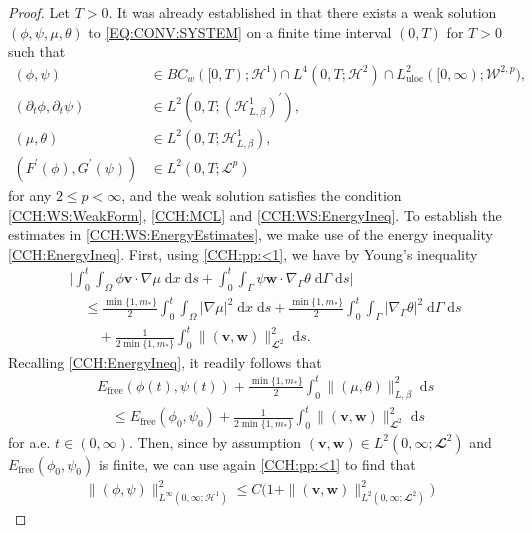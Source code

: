 \documentclass[10pt,reqno]{amsart}
\theoremstyle{remark}
\numberwithin{equation}{section}
\newcommand{\abs}[1]{| #1 |}
\newcommand{\Bigabs}[1]{\Big| #1 \Big|}
\newcommand{\norm}[1]{\| #1 \|}
\newcommand{\bv}{\mathbf{v}}
\newcommand{\bw}{\mathbf{w}}
\newcommand{\intO}{\int_\Omega}
\newcommand{\intG}{\int_\Gamma}
\newcommand{\ds}{\;\mathrm ds}
\newcommand{\dxs}{\;\mathrm{d}x\;\mathrm{d}s}
\newcommand{\dGs}{\;\mathrm{d}\Ga\;\mathrm{d}s}
\newcommand{\delt}{\partial_{t}}
\newcommand{\Grad}{\nabla}
\newcommand{\Gradg}{\nabla_\Ga}
\newcommand{\Ga}{\Gamma}
\begin{document}
\begin{proof}
    Let $T > 0$. It was already established in \cite[Theorem~3.2 and Theorem~3.3]{Giorgini2025} that there exists a weak solution $(\phi,\psi,\mu,\theta)$ to \eqref{EQ:CONV:SYSTEM} on a finite time interval $(0,T)$ for $T > 0$ such that
    \begin{align*}
        (\phi,\psi)&\in BC_w([0,T);\mathcal{H}^1)\cap L^4(0,T;\mathcal{H}^2)\cap L^2_{\mathrm{uloc}}([0,\infty);\mathcal{W}^{2,p}), \\
        (\delt\phi,\delt\psi)&\in L^2(0,T;(\mathcal{H}^1_{L,\beta})^\prime), \\
        (\mu,\theta)&\in L^2(0,T;\mathcal{H}^1_{L,\beta}), \\
        (F^\prime(\phi),G^\prime(\psi))&\in L^2(0,T;\mathcal{L}^p)
    \end{align*}
    for any $2 \leq p < \infty$, and the weak solution satisfies the condition \ref{CCH:WS:WeakForm}, \ref{CCH:MCL} and \ref{CCH:WS:EnergyIneq}. To establish the estimates in \ref{CCH:WS:EnergyEstimates}, we make use of the energy inequality \eqref{CCH:EnergyIneq}. First, using \eqref{CCH:pp:<1}, we have by Young's inequality
    \begin{align*}
        &\Bigabs{\int_0^t\intO \phi\bv\cdot\Grad\mu\dxs + \int_0^t\intG \psi\bw\cdot\Gradg\theta\dGs} \\
        &\quad\leq \frac{\min\{1,m_\ast\}}{2}\int_0^t\intO\abs{\Grad\mu}^2\dxs + \frac{\min\{1,m_\ast\}}{2}\int_0^t\intG\abs{\Gradg\theta}^2\dGs \\
        &\qquad + \frac{1}{2\min\{1,m_\ast\}}\int_0^t\norm{(\bv,\bw)}_{\mathbfcal{L}^2}^2\ds.
    \end{align*}
    Recalling \eqref{CCH:EnergyIneq}, it readily follows that
    \begin{align*}
        &E_{\mathrm{free}}(\phi(t),\psi(t)) + \frac{\min\{1,m_\ast\}}{2}\int_0^t\norm{(\mu,\theta)}_{L,\beta}^2\ds \\
        &\quad\leq E_{\mathrm{free}}(\phi_0,\psi_0) + \frac{1}{2\min\{1,m_\ast\}}\int_0^t \norm{(\bv,\bw)}_{\mathbfcal{L}^2}^2\ds
    \end{align*}
    for a.e. $t\in(0,\infty)$. Then, since by assumption $(\bv,\bw)\in L^2(0,\infty;\mathbfcal{L}^2)$ and $E_{\mathrm{free}}(\phi_0,\psi_0)$ is finite, we can use again \eqref{CCH:pp:<1} to find that
    \begin{align}\label{Est:PP:H1:Linfty}
        \norm{(\phi,\psi)}_{L^\infty(0,\infty;\mathcal{H}^1)}^2 \leq C\big(1 + \norm{(\bv,\bw)}_{L^2(0,\infty;\mathbfcal{L}^2)}^2\big)

\end{align}
\end{proof}
\end{document}
